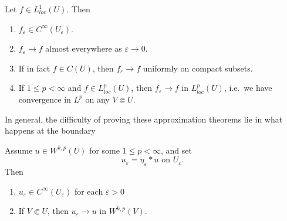 \documentclass[a4paper]{article}
\begin{document}
\begin{thm}
  Let $f \in L^1_{loc}(U)$. Then
  \begin{enumerate}
    \item $f_\varepsilon \in C^\infty(U_\varepsilon)$.
    \item $f_\varepsilon \to f$ almost everywhere as $\varepsilon \to 0$.
    \item If in fact $f \in C(U)$, then $f_\varepsilon \to f$ uniformly on compact subsets.
    \item If $1 \leq p < \infty$ and $f \in L^p_{loc}(U)$, then $f_\varepsilon \to f$ in $L^p_{loc}(U)$, i.e.\ we have convergence in $L^p$ on any $V \Subset U$.\qedsym
  \end{enumerate}
\end{thm}
In general, the difficulty of proving these approximation theorems lie in what happens at the boundary
\begin{lemma}
  Assume $u \in W^{k, p}(U)$ for some $1 \leq p < \infty$, and set
  \[
    u_\varepsilon = \eta_\varepsilon * u\text{ on }U_\varepsilon.
  \]
  Then
  \begin{enumerate}
    \item $u_\varepsilon \in C^\infty(U_\varepsilon)$ for each $\varepsilon > 0$
    \item If $V \Subset U$, then $u_\varepsilon \to u$ in $W^{k, p}(V)$.
  \end{enumerate}
\end{lemma}
\end{document}
